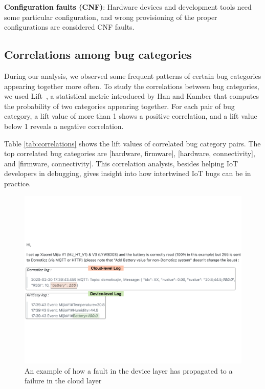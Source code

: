 \textbf{Configuration faults (CNF)}: Hardware devices and development tools need some particular configuration, and wrong provisioning of the proper configurations are considered CNF faults.


\subsection{Correlations among bug categories}
During our analysis, we observed some frequent patterns of certain bug categories appearing together more often. To study the correlations between bug categories, we used Lift~\cite{kamber2001data}, a statistical metric introduced by Han and Kamber that computes the probability of two categories appearing together. For each pair of bug category, a lift value of more than 1 shows a positive correlation, and a lift value below 1 reveals a negative correlation. 

Table \ref{tab:correlations} shows the lift values of correlated bug category pairs. The top correlated bug categories are [hardware, firmware], [hardware, connectivity], and [firmware, connectivity]. This correlation analysis, besides helping IoT developers in debugging, gives insight into how intertwined IoT bugs can be in practice.


 \begin{figure}%
  \centering
   \includegraphics[width=\linewidth]{imgs/corEx}
  \caption{An example of how a fault in the device layer has propagated to a failure in the cloud layer}
  \label{fig:corEx}
\end{figure}


